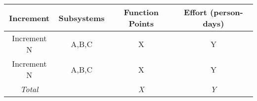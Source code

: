 
\begin{tabular}{c|c|c|c}
\textbf{Increment} & \textbf{Subsystems} & \textbf{Function Points} & \textbf{Effort (person-days)} \\ \hline
Increment N & A,B,C & X & Y \\
Increment N & A,B,C & X & Y \\ \hline
\textit{Total} &  & \textit{X} & \textit{Y} \\
\end{tabular}
